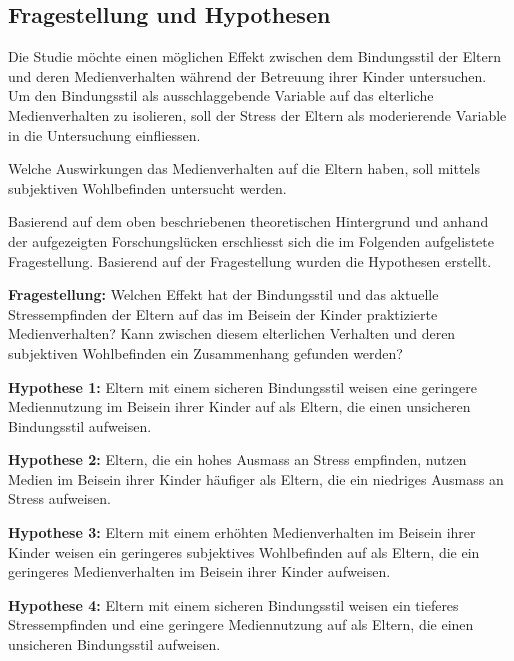 \subsection{Fragestellung und Hypothesen} \label{sec:Fragestellung}
Die Studie möchte einen möglichen Effekt zwischen dem Bindungsstil der Eltern und deren Medienverhalten während der Betreuung ihrer Kinder untersuchen. Um den Bindungsstil als ausschlaggebende Variable auf das elterliche Medienverhalten zu isolieren, soll der Stress der Eltern als moderierende Variable in die Untersuchung einfliessen.

Welche Auswirkungen das Medienverhalten auf die Eltern haben, soll mittels subjektiven Wohlbefinden  untersucht werden. 

Basierend auf dem oben beschriebenen theoretischen Hintergrund und anhand der aufgezeigten Forschungslücken erschliesst sich die im Folgenden aufgelistete Fragestellung. Basierend auf der Fragestellung wurden die Hypothesen erstellt.

\textbf{Fragestellung:}
Welchen Effekt hat der Bindungsstil und das aktuelle Stressempfinden der Eltern auf das im Beisein der Kinder praktizierte Medienverhalten? Kann zwischen diesem elterlichen Verhalten und deren subjektiven Wohlbefinden ein Zusammenhang gefunden werden?

\textbf{Hypothese 1:}
Eltern mit einem sicheren Bindungsstil weisen eine geringere Mediennutzung im Beisein ihrer Kinder auf als Eltern, die einen unsicheren Bindungsstil aufweisen.

\textbf{Hypothese 2:}
Eltern, die ein hohes Ausmass an Stress empfinden, nutzen Medien im Beisein ihrer Kinder häufiger als Eltern, die ein niedriges Ausmass an Stress aufweisen.

\textbf{Hypothese 3:}
Eltern mit einem erhöhten Medienverhalten im Beisein ihrer Kinder weisen ein geringeres subjektives Wohlbefinden auf als Eltern, die ein geringeres Medienverhalten im Beisein ihrer Kinder aufweisen.

\textbf{Hypothese 4:} 
Eltern mit einem sicheren Bindungsstil weisen ein tieferes Stressempfinden und eine geringere Mediennutzung auf als Eltern, die einen unsicheren Bindungsstil aufweisen.

